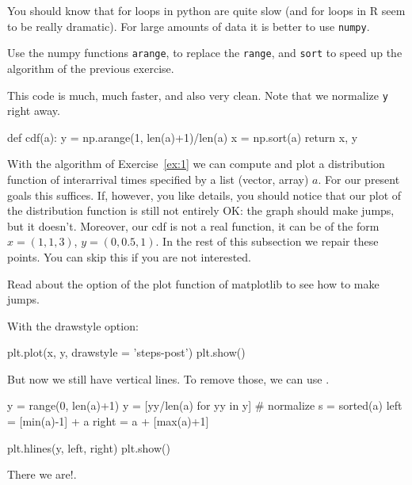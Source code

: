 \documentclass{scrartcl}
\begin{document}
You should know that for loops in python are quite slow (and for loops in R seem to be really dramatic). For large amounts of data it is better to use \texttt{numpy}. 


\begin{exercise}\label{ex:1}
  Use the numpy functions \texttt{arange}, to replace the \texttt{range}, and \texttt{sort} to speed up the algorithm of the previous exercise. 
  \begin{solution}
    This code is much, much faster, and also very clean. Note that we normalize \texttt{y} right away. 
\begin{pyblock}
def cdf(a):
    y = np.arange(1, len(a)+1)/len(a)
    x = np.sort(a)
    return x, y
  
\end{pyblock}
  \end{solution}
\end{exercise}


With the algorithm of Exercise~\ref{ex:1} we can compute and plot a distribution function of interarrival times specified by a list (vector, array) $a$.
For our present goals this suffices.
If, however, you like details, you should notice that our plot of the distribution function is still not entirely OK: the graph should make jumps, but it doesn't.
Moreover, our cdf is not a real function, it can be of the form $x=(1,1,3)$, $y=(0, 0.5, 1)$.
In the rest of this subsection we repair these points.
You can skip this if you are not interested.

\begin{exercise}
Read about the  option of the plot function of matplotlib to see how to make jumps.
  \begin{solution}
With the drawstyle option: 
\begin{pyblock}
plt.plot(x, y,  drawstyle = 'steps-post')
plt.show()
\end{pyblock}


But now we still have vertical lines. To remove those, we can use .

\begin{pyblock}
y = range(0, len(a)+1)
y = [yy/len(a) for yy in y] # normalize
s = sorted(a)
left = [min(a)-1] + a
right = a + [max(a)+1]

plt.hlines(y, left, right)
plt.show()
\end{pyblock}

There  we are!.
  \end{solution}
\end{exercise}
\end{document}
